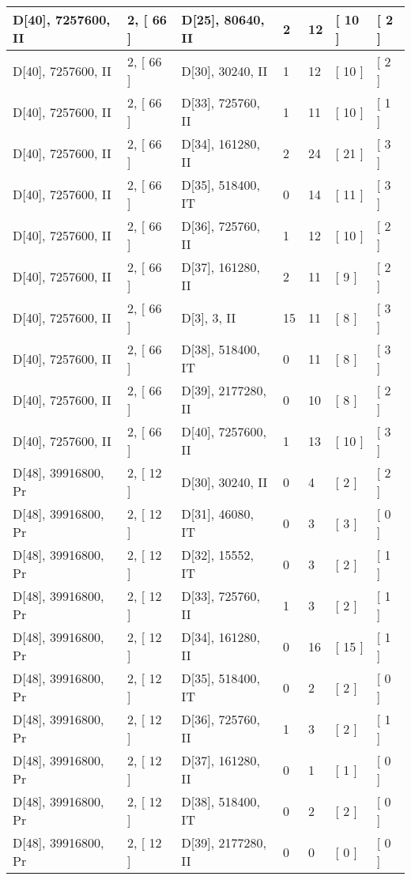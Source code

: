 \documentclass[9 pt]{scrartcl}
\begin{document}
\begin{longtable}{ |p{3em}|p{6em}|p{3em}|p{2em}|p{2em}|p{6em}|p{6em}| }
D[40], 7257600, II &2, [ 66 ] & D[25], 80640, II  & 2 & 12 & [ 10 ] & [ 2 ]\\ \hline
D[40], 7257600, II &2, [ 66 ] & D[30], 30240, II  & 1 & 12 & [ 10 ] & [ 2 ]\\ \hline
D[40], 7257600, II &2, [ 66 ] & D[33], 725760, II  & 1 & 11 & [ 10 ] & [ 1 ]\\ \hline
D[40], 7257600, II &2, [ 66 ] & D[34], 161280, II  & 2 & 24 & [ 21 ] & [ 3 ]\\ \hline
D[40], 7257600, II &2, [ 66 ] & D[35], 518400, IT  & 0 & 14 & [ 11 ] & [ 3 ]\\ \hline
D[40], 7257600, II &2, [ 66 ] & D[36], 725760, II  & 1 & 12 & [ 10 ] & [ 2 ]\\ \hline
D[40], 7257600, II &2, [ 66 ] & D[37], 161280, II  & 2 & 11 & [ 9 ] & [ 2 ]\\ \hline
D[40], 7257600, II &2, [ 66 ] & D[3], 3, II  & 15 & 11 & [ 8 ] & [ 3 ]\\ \hline
D[40], 7257600, II &2, [ 66 ] & D[38], 518400, IT  & 0 & 11 & [ 8 ] & [ 3 ]\\ \hline
D[40], 7257600, II &2, [ 66 ] & D[39], 2177280, II  & 0 & 10 & [ 8 ] & [ 2 ]\\ \hline
D[40], 7257600, II &2, [ 66 ] & D[40], 7257600, II  & 1 & 13 & [ 10 ] & [ 3 ]\\ \hline
D[48], 39916800, Pr &2, [ 12 ] & D[30], 30240, II  & 0 & 4 & [ 2 ] & [ 2 ]\\ \hline
D[48], 39916800, Pr &2, [ 12 ] & D[31], 46080, IT  & 0 & 3 & [ 3 ] & [ 0 ]\\ \hline
D[48], 39916800, Pr &2, [ 12 ] & D[32], 15552, IT  & 0 & 3 & [ 2 ] & [ 1 ]\\ \hline
D[48], 39916800, Pr &2, [ 12 ] & D[33], 725760, II  & 1 & 3 & [ 2 ] & [ 1 ]\\ \hline
D[48], 39916800, Pr &2, [ 12 ] & D[34], 161280, II  & 0 & 16 & [ 15 ] & [ 1 ]\\ \hline
D[48], 39916800, Pr &2, [ 12 ] & D[35], 518400, IT  & 0 & 2 & [ 2 ] & [ 0 ]\\ \hline
D[48], 39916800, Pr &2, [ 12 ] & D[36], 725760, II  & 1 & 3 & [ 2 ] & [ 1 ]\\ \hline
D[48], 39916800, Pr &2, [ 12 ] & D[37], 161280, II  & 0 & 1 & [ 1 ] & [ 0 ]\\ \hline
D[48], 39916800, Pr &2, [ 12 ] & D[38], 518400, IT  & 0 & 2 & [ 2 ] & [ 0 ]\\ \hline
D[48], 39916800, Pr &2, [ 12 ] & D[39], 2177280, II  & 0 & 0 & [ 0 ] & [ 0 ]\\ \hline

\end{longtable}
\end{document}

